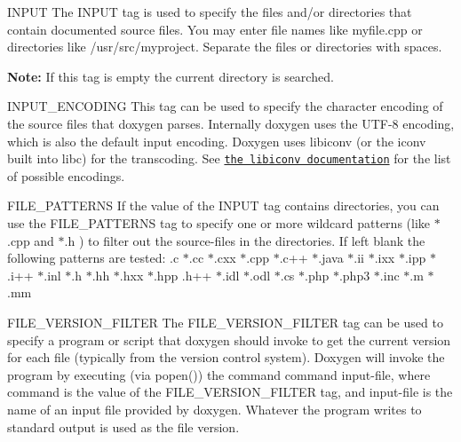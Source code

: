 \begin{DoxyDescription}
\item[{\ttfamily INPUT} ] The {\ttfamily INPUT} tag is used to specify the files and/or directories that contain documented source files. You may enter file names like {\ttfamily myfile.cpp} or directories like {\ttfamily /usr/src/myproject}. Separate the files or directories with spaces.\par


{\bfseries Note:} If this tag is empty the current directory is searched.

\label{config_cfg_input_encoding}
\hypertarget{config_cfg_input_encoding}{}
 
\item[{\ttfamily INPUT\_\-ENCODING} ] This tag can be used to specify the character encoding of the source files that doxygen parses. Internally doxygen uses the UTF-\/8 encoding, which is also the default input encoding. Doxygen uses libiconv (or the iconv built into libc) for the transcoding. See \href{http://www.gnu.org/software/libiconv}{\tt the libiconv documentation} for the list of possible encodings.

\label{config_cfg_file_patterns}
\hypertarget{config_cfg_file_patterns}{}
 
\item[{\ttfamily FILE\_\-PATTERNS} ] If the value of the {\ttfamily INPUT} tag contains directories, you can use the {\ttfamily FILE\_\-PATTERNS} tag to specify one or more wildcard patterns (like {\ttfamily $\ast$}.cpp and {\ttfamily $\ast$}.h ) to filter out the source-\/files in the directories. If left blank the following patterns are tested: {\ttfamily  .c $\ast$.cc $\ast$.cxx $\ast$.cpp $\ast$.c++ $\ast$.java $\ast$.ii $\ast$.ixx $\ast$.ipp $\ast$.i++ $\ast$.inl $\ast$.h $\ast$.hh $\ast$.hxx $\ast$.hpp .h++ $\ast$.idl $\ast$.odl $\ast$.cs $\ast$.php $\ast$.php3 $\ast$.inc $\ast$.m $\ast$.mm }

\label{config_cfg_file_version_filter}
\hypertarget{config_cfg_file_version_filter}{}
 
\item[{\ttfamily FILE\_\-VERSION\_\-FILTER} ] The {\ttfamily FILE\_\-VERSION\_\-FILTER} tag can be used to specify a program or script that doxygen should invoke to get the current version for each file (typically from the version control system). Doxygen will invoke the program by executing (via popen()) the command {\ttfamily command input-\/file}, where {\ttfamily command} is the value of the {\ttfamily FILE\_\-VERSION\_\-FILTER} tag, and {\ttfamily input-\/file} is the name of an input file provided by doxygen. Whatever the program writes to standard output is used as the file version.


\end{DoxyDescription}

